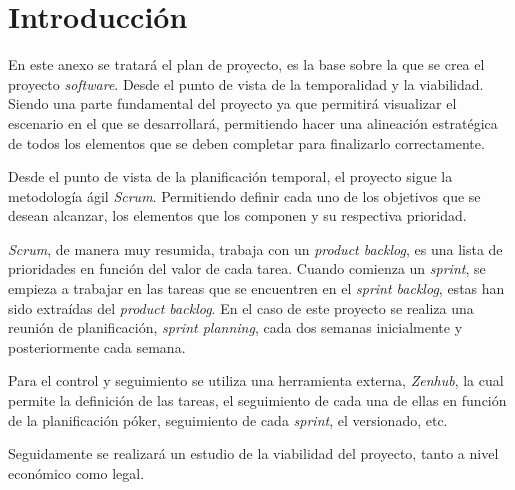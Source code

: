 \section{Introducción}
En este anexo se tratará el plan de proyecto, es la base sobre la que se crea el proyecto \textit{software}. Desde el punto de vista de la temporalidad y la viabilidad. Siendo una parte fundamental del proyecto ya que permitirá visualizar el escenario en el que se desarrollará, permitiendo hacer una alineación estratégica de todos los elementos que se deben completar para finalizarlo correctamente.

Desde el punto de vista de la planificación temporal, el proyecto sigue la metodología ágil \textit{Scrum}. Permitiendo definir cada uno de los objetivos que se desean alcanzar, los elementos que los componen y su respectiva prioridad.

\textit{Scrum}, de manera muy resumida, trabaja con un \textit{product backlog}, es una lista de prioridades en función del valor de cada tarea. Cuando comienza un \textit{sprint}, se empieza a trabajar en las tareas que se encuentren en el \textit{sprint backlog}, estas han sido extraídas del \textit{product backlog}. En el caso de este proyecto se realiza una reunión de planificación, \textit{sprint planning}, cada dos semanas inicialmente y posteriormente cada semana.

Para el control y seguimiento se utiliza una herramienta externa, \textit{Zenhub}, la cual permite la definición de las tareas, el seguimiento de cada una de ellas en función de la planificación póker, seguimiento de cada \textit{sprint}, el versionado, etc.

Seguidamente se realizará un estudio de la viabilidad del proyecto, tanto a nivel económico como legal.
\newpage

